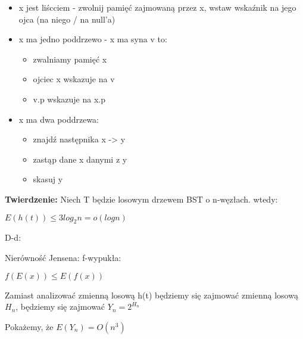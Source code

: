 \documentclass{article}
\begin{document}
    \begin{itemize}
        \item x jest liścciem - zwolnij pamięć zajmowaną przez x, wstaw wskaźnik na jego ojca (na niego / na null'a)
        \item x ma jedno poddrzewo - x ma syna v to: \par
        \begin {itemize}
            \item zwalniamy pamięć x
            \item ojciec x wskazuje na v
            \item v.p wskazuje na x.p
        \end{itemize}
        \item x ma dwa poddrzewa: \par
        \begin{itemize}
            \item znajdź następnika x -> y
            \item zastąp dane x danymi z y
            \item skasuj y
        \end{itemize}
    \end{itemize}
    \vspace{1\baselineskip}
    \textbf{Twierdzenie: } Niech T będzie losowym drzewem  BST o n-węzłach. wtedy: \par
    
    $E(h(t)) \leq 3log_2{n} = o(logn)$ \par

    D-d: \par
    Nierówność Jensena: f-wypukła: \par
    $f(E(x)) \leq E(f(x))$

    Zamiast analizować zmienną losową h(t) będziemy się zajmować zmienną losową $H_{n}$, będziemy się zajmować $Y_{n} = 2^{H_{n}}$ \par

    Pokażemy, że $E(Y_{n}) = O(n^3)$ \par
\end{document}
